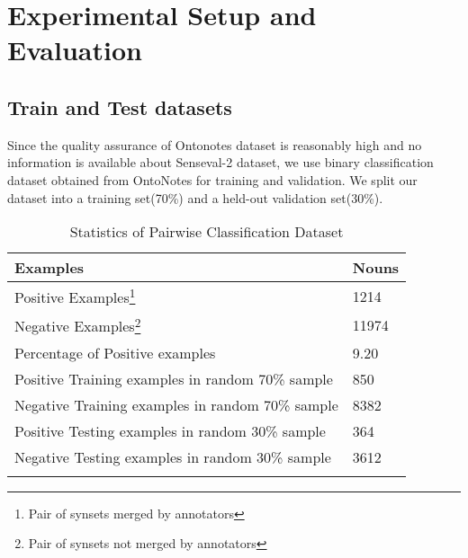 \section{Experimental Setup and Evaluation}
\label{section:SupervisedExperimentalSetupAndEvaluation}
\subsection{Train and Test datasets}
Since the quality assurance of Ontonotes dataset is reasonably high and no information is available about Senseval-2 dataset, we use binary classification dataset obtained from OntoNotes for training and validation. We split our dataset into a training set(70\%) and a held-out validation set(30\%). 
\begin{center}
\begin{longtable}{| l | l |}      
    \hline
    Examples & Nouns \\ \hline    
    Positive Examples\footnote{Pair of synsets merged by annotators} & 1214 \\ \hline
    Negative Examples\footnote{Pair of synsets not merged by annotators} & 11974 \\ \hline
    Percentage of Positive examples & 9.20 \\ \hline
    Positive Training examples in random 70\% sample & 850 \\ \hline
    Negative Training examples in random 70\% sample & 8382 \\ \hline
    Positive Testing examples in random 30\% sample & 364 \\ \hline
    Negative Testing examples in random 30\% sample & 3612 \\ \hline    
    \caption{Statistics of Pairwise Classification Dataset}
  \label{tab:pairwiseData}
\end{longtable}
\end{center}
\begin{comment}
\begin{center}
\begin{longtable}{| l | l | l |}      
    \hline
    Examples & Nouns & Verbs \\ \hline    
    Positive Examples\footnote{Pair of synsets merged by annotators} & 1214 & 6881 \\ \hline
    Negative Examples\footnote{Pair of synsets not merged by annotators} & 11974 & 20899 \\ \hline
    Percentage of Positive examples & 9.20 & 24.76 \\ \hline
    Positive Training examples in random 70\% sample & 850 & 4817\\ \hline
    Negative Training examples in random 70\% sample & 8382 & 14630\\ \hline
    Positive Testing examples in random 30\% sample & 364 & 2064\\ \hline
    Negative Testing examples in random 30\% sample & 3612 & 6269\\ \hline    
    \caption{Statistics of Pairwise Classification Dataset}
  \label{tab:pairwiseDataNounVerb}
\end{longtable}
\end{center}
\end{comment}

